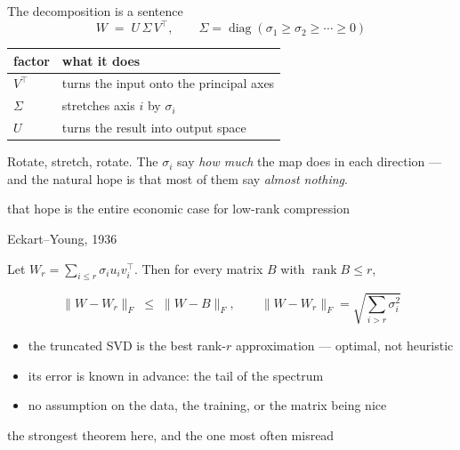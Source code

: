 \documentclass[aspectratio=169,11pt]{beamer}
\newcommand{\hl}[1]{{\color{accent}#1}}
\begin{document}
\begin{frame}{The decomposition is a sentence}
  \vspace{6pt}
  \[
    W \;=\; U\,\Sigma\,V^{\top},
    \qquad \Sigma=\operatorname{diag}(\sigma_1\ge\sigma_2\ge\cdots\ge0)
  \]
  \vspace{2pt}

  {\small\color{bodyink}
  \begin{tabular}{@{}p{2.6cm}p{7.4cm}@{}}
    \toprule
    \textcolor{mute}{factor} & \textcolor{mute}{what it does} \\
    \midrule
    $V^{\top}$ & turns the input onto the principal axes \\
    $\Sigma$   & stretches axis $i$ by $\sigma_i$ \\
    $U$        & turns the result into output space \\
    \bottomrule
  \end{tabular}}

  \vspace{10pt}
  {\color{bodyink}
  \hl{Rotate, stretch, rotate.} The $\sigma_i$ say \emph{how much} the map does in
  each direction --- and the natural hope is that most of them say
  \emph{almost nothing}.\par}

  \vspace{6pt}
  {\ttfamily\scriptsize\color{stone}
  that hope is the entire economic case for low-rank compression}
\end{frame}

\begin{frame}{Eckart--Young, 1936}
  \vspace{2pt}
  {\small\color{bodyink}Let $W_r=\sum_{i\le r}\sigma_i u_i v_i^{\top}$. Then for
  every matrix $B$ with $\operatorname{rank}B\le r$,\par}
  \vspace{6pt}
  \[
    \|W-W_r\|_F \;\le\; \|W-B\|_F,
    \qquad
    \|W-W_r\|_F=\sqrt{\sum_{i>r}\sigma_i^{2}}
  \]
  \vspace{4pt}

  \begin{itemize}
    \item the truncated SVD is the \hl{best} rank-$r$ approximation --- optimal,
          not heuristic
    \item its error is \hl{known in advance}: the tail of the spectrum
    \item no assumption on the data, the training, or the matrix being nice
  \end{itemize}

  \vspace{4pt}
  {\ttfamily\scriptsize\color{stone}
  the strongest theorem here, and the one most often misread}
\end{frame}
\end{document}
